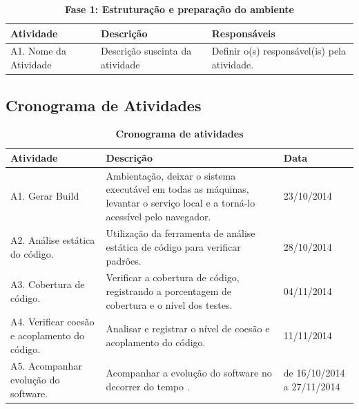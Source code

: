 \begin{table}[htbp]
\centering
\caption{\textbf{Fase 1: Estruturação e preparação do ambiente}}
\begin{tabular}{|p{2.5cm}|p{10cm}|p{2.5cm}|}
\hline
\textbf{Atividade} & \textbf{Descrição} & \textbf{Responsáveis} \\ \hline
A1. Nome da Atividade & Descrição suscinta da atividade & Definir o(s) responsável(is) pela atividade. \\ \hline
\end{tabular}
\label{}
\end{table}


\subsection{Cronograma de Atividades} %
\label{sub:cronograma_de_atividades}

\begin{table}[htbp]
\centering
\caption{\textbf{Cronograma de atividades}}
\begin{tabular}{|p{2.5cm}|p{10cm}|p{2.5cm}|}
\hline
\textbf{Atividade} & \textbf{Descrição} & \textbf{Data} \\ \hline
A1. Gerar Build & Ambientação, deixar o sistema executável em todas as máquinas, levantar o serviço local e a torná-lo acessível pelo navegador. & 23/10/2014 \\ \hline
A2. Análise estática do código. & Utilização da ferramenta de análise estática de código para verificar padrões. & 28/10/2014 \\ \hline
A3. Cobertura de código. & Verificar a cobertura de código, registrando a porcentagem de cobertura e o nível dos testes. & 04/11/2014 \\ \hline
A4. Verificar coesão e acoplamento do código. & Analisar e registrar o nível de coesão e acoplamento do código. & 11/11/2014 \\ \hline
A5. Acompanhar evolução do software. & Acompanhar a evolução do software no decorrer do tempo . & de 16/10/2014 a 27/11/2014 \\ \hline
\end{tabular}
\label{}
\end{table}

